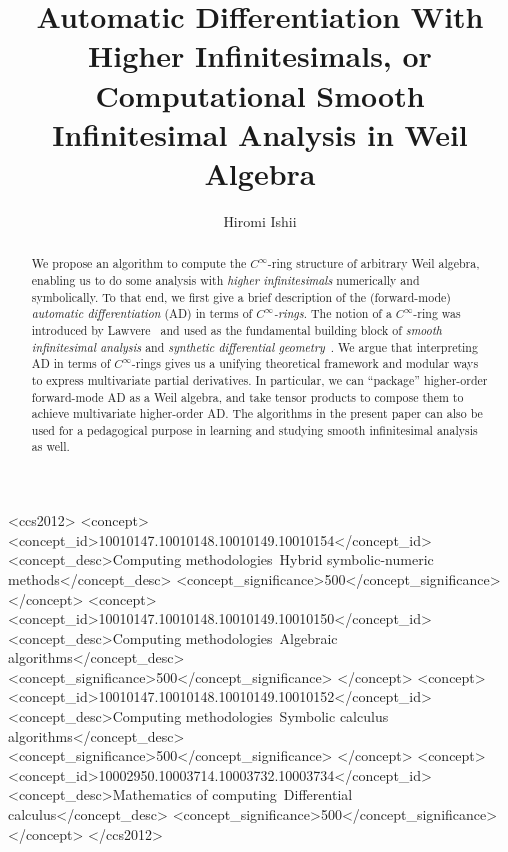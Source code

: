 \documentclass[%
  sigconf,authorversion,screen]{acmart}
\begin{document}
\title[Automatic Differentiation With Higher Infinitesimals]{Automatic Differentiation With Higher Infinitesimals, or Computational Smooth Infinitesimal Analysis in Weil Algebra}

\author{Hiromi Ishii}

\renewcommand{\shortauthors}{Hiromi ISHII}

\begin{abstract}
  \frenchspacing
  We propose an algorithm to compute the $C^\infty$-ring structure of arbitrary Weil algebra, enabling us to do some analysis with \emph{higher infinitesimals} numerically and symbolically.
  To that end, we first give a brief description of the (forward-mode) \emph{automatic differentiation} (AD) in terms of \emph{$C^\infty$-rings}.
  The notion of a $C^\infty$-ring was introduced by Lawvere~\cite{lawvere1979categorical} and used as the fundamental building block of \emph{smooth infinitesimal analysis} and \emph{synthetic differential geometry}~\cite{Moerdijk:1991aa}.
  We argue that interpreting AD in terms of $C^\infty$-rings gives us a unifying theoretical framework and modular ways to express multivariate partial derivatives.
  In particular, we can ``package'' higher-order forward-mode AD as a Weil algebra, and take tensor products to compose them to achieve multivariate higher-order AD.
  The algorithms in the present paper can also be used for a pedagogical purpose in learning and studying smooth infinitesimal analysis as well.
\end{abstract}

\begin{CCSXML}
<ccs2012>
    <concept>
        <concept_id>10010147.10010148.10010149.10010154</concept_id>
        <concept_desc>Computing methodologies~Hybrid symbolic-numeric methods</concept_desc>
        <concept_significance>500</concept_significance>
        </concept>
    <concept>
        <concept_id>10010147.10010148.10010149.10010150</concept_id>
        <concept_desc>Computing methodologies~Algebraic algorithms</concept_desc>
        <concept_significance>500</concept_significance>
        </concept>
    <concept>
        <concept_id>10010147.10010148.10010149.10010152</concept_id>
        <concept_desc>Computing methodologies~Symbolic calculus algorithms</concept_desc>
        <concept_significance>500</concept_significance>
        </concept>
    <concept>
        <concept_id>10002950.10003714.10003732.10003734</concept_id>
        <concept_desc>Mathematics of computing~Differential calculus</concept_desc>
        <concept_significance>500</concept_significance>
        </concept>
  </ccs2012>
\end{CCSXML}
\end{document}
